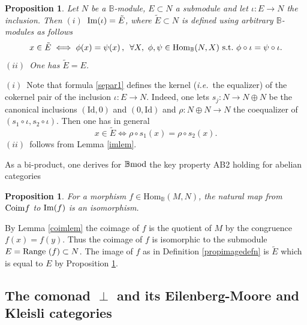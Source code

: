 \documentclass[12pt]{article}
\newtheorem{prop}[thm]{Proposition}
\def\Hom{{\rm Hom}}
\def\id{{\rm id}}
\def\B{{\mathbb B}}
\def\im{{\rm Im}}
\def\qqq{\,,\,~\forall}
\newcommand{\ie}{{\it i.e.\/}\ }
\def\id{{\mbox{Id}}}
\def\Hom {{\mbox{Hom}}}
\def\bmod{{\rm \B mod}}
\def\coim{{\rm Coim}}
\begin{document}
\begin{prop} \label{imlem1} 
Let $N$ be a $\B$-module, $E\subset N$  a submodule and let $\iota:E\to N$ the inclusion. Then \newline
$(i)$~$\im(\iota)=\tilde E$, where $\tilde E\subset N$ is defined using arbitrary $\B$-modules as follows
\begin{equation}\label{separ1}
x\in\tilde E\iff \phi(x)=\psi(x) \qqq X,\ \phi,\psi \in \Hom_\B(N,X)~{\rm s.t.}~ \phi\circ \iota=\psi \circ \iota.
\end{equation}
$(ii)$~One has $\tilde E=E$.
\end{prop}
\proof $(i)$~Note that formula \eqref{separ1} defines the kernel (\ie the equalizer) of the cokernel pair of the inclusion $\iota:E\to N$. Indeed, one lets $s_j:N\to N\oplus N$ be the canonical inclusions $(\id,0)$ and $(0,\id)$ and $\rho:N\oplus N\to N$ the coequalizer of $(s_1\circ \iota,s_2\circ \iota)$. Then one has in general 
\begin{equation}\label{separbis}
x\in\tilde E\iff \rho\circ s_1(x)=\rho\circ s_2(x). 
\end{equation}
$(ii)$~follows from Lemma \ref{imlem}. 
\endproof

As a bi-product, one derives for $\bmod$  the key property AB2 holding for abelian categories
\begin{prop}\label{corinj}
For a morphism $f\in \Hom_\B(M,N)$, the natural map from $\coim f$ to $\im(f)$ is an isomorphism.	
\end{prop}
\proof  By Lemma \ref{coimlem} the coimage of $f$ is the quotient of $M$ by the congruence  $f(x)=f(y)$. Thus the coimage of $f$ is isomorphic to the submodule $E={\rm Range}\ (f)\subset N$. The image of $f$ as in Definition \ref{propimagedefn} is $\tilde E$ which is equal to $E$ by Proposition  \ref{imlem1}.  \endproof


\subsection{The comonad $\perp$ and its Eilenberg-Moore and Kleisli categories}\label{grandis remark} 
\end{document}

